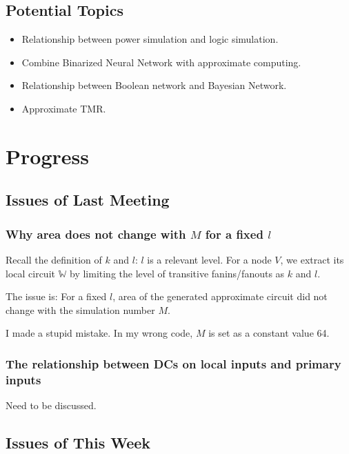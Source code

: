 \documentclass{rpt}
\begin{document}
\subsection{Potential Topics}
\begin{itemize}
    \item Relationship between power simulation and logic simulation.
    \item Combine Binarized Neural Network with approximate computing.
    \item Relationship between Boolean network and Bayesian Network.
    \item Approximate TMR\@.
\end{itemize}

\section{Progress}

\subsection{Issues of Last Meeting}

\subsubsection*{Why area does not change with $M$ for a fixed $l$}
Recall the definition of $k$ and $l$:
$l$ is a relevant level.
For a node $V$,
we extract its local circuit $\mathbb{W}$ by limiting the level of transitive fanins/fanouts as $k$ and $l$.

The issue is:
For a fixed $l$,
area of the generated approximate circuit did not change with the simulation number $M$.

I made a stupid mistake.
In my wrong code,
$M$ is set as a constant value 64.

\subsubsection*{The relationship between DCs on local inputs and primary inputs}
Need to be discussed.

\subsection{Issues of This Week}
\end{document}
